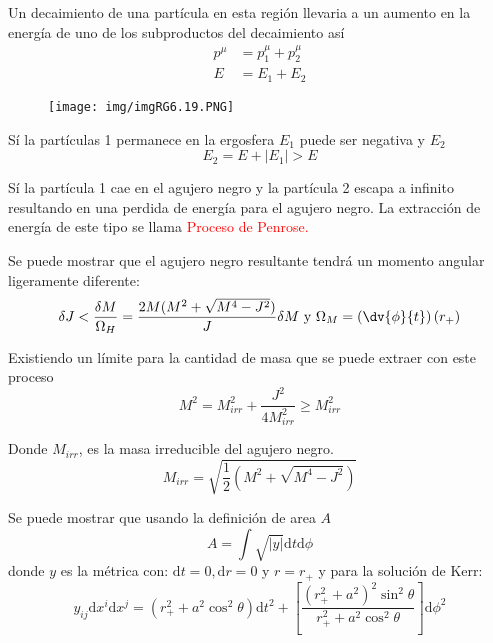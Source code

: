 \documentclass[../main]{subfiles}
\begin{document}
\begin{adjustwidth}{0pt}{-100pt}
Un decaimiento de una partícula en esta región llevaria a un aumento en la energía de uno de los subproductos del decaimiento así 
\begin{align}
    p^{\mu}&=p^{\mu}_1+p^{\mu}_2 \\
    E&=E_1+E_2
\end{align}
\begin{figure}[H]
    \begin{adjustwidth}{0pt}{-100pt}
    \centering
    \texttt{[image: img/imgRG6.19.PNG]}
    \end{adjustwidth}
\end{figure}

Sí la partículas 1 permanece en la ergosfera $E_1$ puede ser negativa y $E_2$
\begin{equation}
    E_2=E+|E_1|>E
\end{equation}

Sí la partícula 1 cae en el agujero negro y la partícula 2 escapa a infinito resultando en una perdida de energía para el agujero negro. La extracción de energía de este tipo se llama \textcolor{red}{Proceso de Penrose.}

Se puede mostrar que el agujero negro resultante tendrá un momento angular ligeramente diferente:
\begin{equation}
    \delta J < \dfrac{\delta M}{\Omega_H}=\dfrac{2M(M^2+\sqrt{M^4-J^2})}{J}\delta M \ \text{y} \ \Omega_M=\left(\dv{\phi}{t}\right)(r_+)
\end{equation}

Existiendo un límite para la cantidad de masa que se puede extraer con este proceso
\begin{equation}
    M^2=M^2_{irr}+\dfrac{J^2}{4M^2_{irr}}\geq M^2_{irr}
\end{equation}

Donde $M_{irr}$, es la masa irreducible del agujero negro.
\begin{equation}
    M_{irr}=\sqrt{\dfrac{1}{2}\left(M^2+\sqrt{M^4-J^2}\right)}
\end{equation}

Se puede mostrar que usando la definición de area $A$
\begin{equation}
    A=\int \sqrt{|y|}\mathrm{d}t \mathrm{d}\phi
\end{equation}
donde $y$ es la métrica con: $\mathrm{d}t=0, \mathrm{d}r=0$ y $r=r_+$ y para la solución de Kerr:
\begin{equation}
    y_{ij}\mathrm{d}x^{i}\mathrm{d}x^{j}=(r^2_{+}+a^2\cos^2 \theta)\mathrm{d}t^2+\left[\dfrac{(r^2_{+} +a^2)^2\sin^2 \theta}{r^2_{+} +a^2\cos^2 \theta}\right]\mathrm{d}\phi^2
\end{equation}


\end{adjustwidth}
\end{document}
